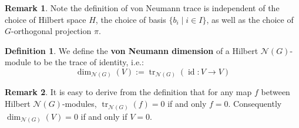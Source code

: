\documentclass[11pt]{report}
\theoremstyle{definition}
\newtheorem{Def}{Definition}[chapter]
\newtheorem{Rmk}{Remark}[chapter]
\theoremstyle{plain}
\DeclareMathOperator{\tr}{tr}
\DeclareMathOperator{\id}{id}
\newcommand{\vna}{\mathcal{N}}
\begin{document}
\begin{Rmk}
	Note the definition of von Neumann trace is independent of the choice of Hilbert space $H$, the choice of basis $\{b_i\mid i\in I\}$, as well as the choice of $G$-orthogonal projection $\pi$. 
\end{Rmk}
\begin{Def}
	We define the \textbf{von Neumann dimension} of a Hilbert $\vna(G)$-module to be the trace of identity, i.e.:
	\begin{equation*}
		\dim_{\vna(G)}(V):=\tr_{\vna(G)}(\id:V\to V)
	\end{equation*}
\end{Def}
\begin{Rmk}\label{1.12}
	It is easy to derive from the definition that for any map $f$ between Hilbert $\vna(G)$-modules, $\tr_{\vna(G)}(f)=0 $ if and only $f=0$. Consequently $\dim_{\vna(G)}(V)=0$ if and only if $V=0$.
\end{Rmk}
\end{document}
